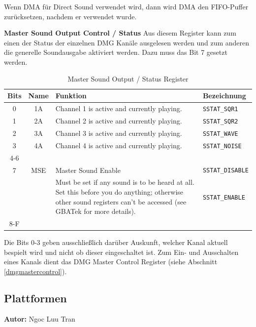 \documentclass[11pt,a4paper]{scrartcl}
\newcommand{\AutorNgoc} {
    \vspace{-4mm}
    \large \textbf{Autor:} Ngoc Luu Tran \normalsize
    \vspace{2mm}
}
\newcommand{\paratitle}[1] {
    \vspace{5mm}
    \large \textbf{#1} \normalsize
    \vspace{2mm}\newline
}
\begin{document}
Wenn DMA f\"ur Direct Sound verwendet wird, dann wird DMA den FIFO-Puffer zur\"ucksetzen, nachdem er verwendet wurde.


\newpage	
\paratitle{Master Sound Output Control / Status} \label{mastersoundoutputcontrol}
Aus diesem Register kann zum einen der Status der einzelnen DMG Kan\"ale ausgelesen werden und zum anderen die generelle Soundausgabe aktiviert werden. Dazu muss das Bit 7 gesetzt werden.

\begin{table}[h]
	\centering
    \begin{tabular}{ c | c | p{10cm} | l } 
	    \textbf{Bits} & \textbf{Name} & \textbf{Funktion} & \textbf{Bezeichnung} \\
	    \hline
	    0 & 1A & Channel 1 is active and currently playing. & \verb|SSTAT_SQR1| \\
	    \hline
	    1 & 2A & Channel 2 is active and currently playing. & \verb|SSTAT_SQR2| \\
	    \hline
	    2 & 3A & Channel 3 is active and currently playing. & \verb|SSTAT_WAVE| \\
	    \hline
	    3 & 4A & Channel 4 is active and currently playing. & \verb|SSTAT_NOISE| \\
	    \hline
	    4-6 & & & \\
	    \hline
	    7 & MSE & Master Sound Enable & \verb|SSTAT_DISABLE| \\
	      &     & Must be set if any sound is to be heard at all. Set this before you do anything; otherwise other sound registers can't be accessed (see GBATek for more details). & \verb|SSTAT_ENABLE| \\
	    \hline
	    8-F & & & \\
	\end{tabular}
	\caption{Master Sound Output / Status Register}
	\label{table:MasterSoundOutputControlStatusRegister}
\end{table}

Die Bits 0-3 geben ausschlie{\ss}lich dar\"uber Auskunft, welcher Kanal aktuell bespielt wird und nicht ob dieser eingeschaltet ist. Zum Ein- und Ausschalten eines Kanals dient das DMG Master Control Register (siehe Abschnitt \ref{dmgmastercontrol}).



\newpage
\subsection{Plattformen} \label{Plattformen}
\AutorNgoc
\end{document}
